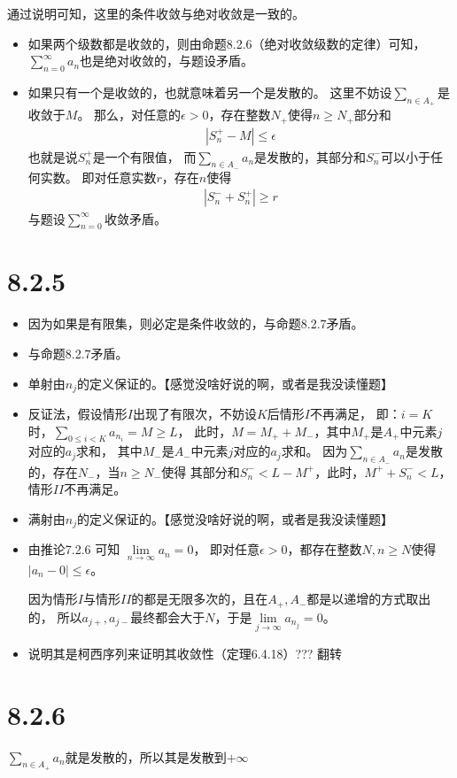 \documentclass{article}
\begin{document}
通过说明可知，这里的条件收敛与绝对收敛是一致的。

\begin{itemize}
  \item  如果两个级数都是收敛的，则由命题8.2.6（绝对收敛级数的定律）可知，
        $\sum \limits_{n=0}^\infty a_n$也是绝对收敛的，与题设矛盾。
  \item  如果只有一个是收敛的，也就意味着另一个是发散的。
        这里不妨设$\sum \limits_{n \in A_{+}}$是收敛于$M$。
        那么，对任意的$\epsilon > 0$，存在整数$N_{+}$使得$n \geq N_{+}$部分和
        \begin{align*}
          |S_{n}^{+} - M| \leq \epsilon
        \end{align*}
        也就是说$S_{n}^{+}$是一个有限值，
        而$\sum \limits_{n \in A_{-}} a_n$是发散的，其部分和$S_{n}^{-}$可以小于任何实数。
        即对任意实数$r$，存在$n$使得
        \begin{align*}
          |S_{n}^{-} + S_{n}^{+}| \geq r
        \end{align*}
        与题设$\sum \limits_{n=0}^\infty$收敛矛盾。
\end{itemize}

\section*{8.2.5}

\begin{itemize}
  \item 因为如果是有限集，则必定是条件收敛的，与命题8.2.7矛盾。
  \item 与命题8.2.7矛盾。
  \item 单射由$n_j$的定义保证的。【感觉没啥好说的啊，或者是我没读懂题】
  \item 反证法，假设情形$I$出现了有限次，不妨设$K$后情形$I$不再满足，
        即：$i = K$时，$\sum \limits_{0 \leq i < K} a_{n_i} = M \geq L$，
        此时，$M = M_{+} + M_{-}$，其中$M_{+}$是$A_{+}$中元素$j$对应的$a_j$求和，
        其中$M_{-}$是$A_{-}$中元素$j$对应的$a_j$求和。
        因为$\sum \limits_{n \in A_{-}} a_{n}$是发散的，存在$N_{-}$，当$n \geq N_{-}$使得
        其部分和$S_{n}^{-} < L - M^{+}$，此时，$M^{+} + S_{n}^{-} < L$，情形$II$不再满足。
  \item 满射由$n_j$的定义保证的。【感觉没啥好说的啊，或者是我没读懂题】
  \item 由推论7.2.6 可知 $\lim \limits_{n \rightarrow \infty} a_n = 0$，
        即对任意$\epsilon > 0$，都存在整数$N, n \geq N$使得$|a_n - 0| \leq \epsilon$。

        因为情形$I$与情形$II$的都是无限多次的，且在$A_{+},A_{-}$都是以递增的方式取出的，
        所以$a_{j+}, a_{j-}$最终都会大于$N$，于是$\lim \limits_{j \rightarrow \infty} a_{n_j} = 0$。
  \item 说明其是柯西序列来证明其收敛性（定理6.4.18）??? 翻转
\end{itemize}

\section*{8.2.6}

$\sum \limits_{n \in A_{+}} a_n$就是发散的，所以其是发散到$+\infty$
\end{document}
